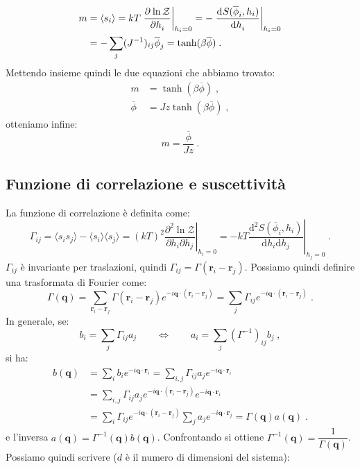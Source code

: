 \documentclass[10pt,a4paper]{report}
\theoremstyle{definition}
\newcommand{\pdev}[3][]{\frac{\partial^{#1} #2}{\partial #3^{#1}}}
\newcommand{\dev}[3][]{\frac{\mathrm{d}^{#1} #2}{\mathrm{d} #3^{#1}}}
\numberwithin{equation}{section}
\newcommand{\diff}[1][]{\mathrm{d}#1}
\newcommand{\bra}{\langle}
\newcommand{\ket}{\rangle}
\newcommand{\zpart}{\mathcal{Z}}
\begin{document}
\begin{align}
m &=\bra s_i\ket =kT\left.\pdev{\ln\zpart}{h_i}\right|_{h_i=0}=-\left.\dev{S(\overline{\phi}_i,h_i)}{h_i}\right|_{h_i=0} \notag \\
&=-\sum_j(J^{-1})_{ij}\overline{\phi}_j=\tanh(\beta\overline{\phi})\;.
\end{align}
Mettendo insieme quindi le due equazioni che abbiamo trovato:
\begin{align*}
m &= \tanh(\beta\overline{\phi})\;, \\
\overline{\phi} &= Jz\tanh(\beta\overline{\phi})\;,
\end{align*}
otteniamo infine:
\begin{equation}
m=\frac{\overline{\phi}}{Jz}\;.
\end{equation}
\subsection{Funzione di correlazione e suscettività}
La funzione di correlazione è definita come:
\begin{equation}
\Gamma_{ij}=\bra s_is_j\ket-\bra s_i\ket\bra s_j\ket=(kT)^2\left.\frac{\partial^2\ln\zpart}{\partial h_i\partial h_j}\right|_{h_i=0}=-kT\left.\frac{\diff^2{S(\overline{\phi}_i,h_i)}}{\diff{h_i}\diff{h_j}}\right|_{h_j=0}\;.
\end{equation}
$\Gamma_{ij}$ è invariante per traslazioni, quindi $\Gamma_{ij}=\Gamma(\mathbf{r}_i-\mathbf{r}_j)$. Possiamo quindi definire una trasformata di Fourier come:
\begin{equation}
\Gamma(\mathbf{q})=\sum_{\mathbf{r}_i-\mathbf{r}_j}\Gamma(\mathbf{r}_i-\mathbf{r}_j)e^{-i\mathbf{q}\cdot(\mathbf{r}_i-\mathbf{r}_j)}=\sum_j\Gamma_{ij}e^{-i\mathbf{q}\cdot(\mathbf{r}_i-\mathbf{r}_j)}\;.
\end{equation}
In generale, se:
$$
b_i=\sum_j \Gamma_{ij}a_j\qquad \Longleftrightarrow\qquad a_i=\sum_j(\Gamma^{-1})_{ij}b_j\;,
$$
si ha:
\begin{align*}
b(\mathbf{q})&=\sum_ib_ie^{-i\mathbf{q}\cdot\mathbf{r}_i}=\sum_{i,j}\Gamma_{ij}a_je^{-i\mathbf{q}\cdot\mathbf{r}_i} \\
&=\sum_{i,j}\Gamma_{ij}a_je^{-i\mathbf{q}\cdot(\mathbf{r}_i-\mathbf{r}_j)}e^{-i\mathbf{q}\cdot\mathbf{r}_i} \\
&=\sum_i\Gamma_{ij}e^{-i\mathbf{q}\cdot(\mathbf{r}_i-\mathbf{r}_j)}\sum_ja_je^{-i\mathbf{q}\cdot\mathbf{r}_j}=\Gamma(\mathbf{q})a(\mathbf{q})\;.
\end{align*}
e l'inversa $a(\mathbf{q})=\Gamma^{-1}(\mathbf{q})b(\mathbf{q})$. Confrontando si ottiene $\Gamma^{-1}(\mathbf{q})=\dfrac{1}{\Gamma(\mathbf{q})}$. Possiamo quindi scrivere ($d$ è il numero di dimensioni del sistema):
\end{document}
